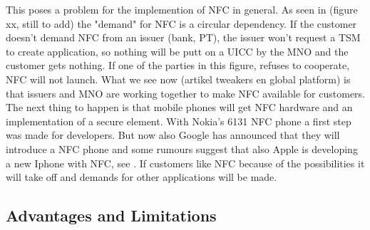 This poses a problem for the implemention of NFC in general. As seen in (figure xx, still to add) the "demand" for NFC is a circular dependency. If the customer doesn't demand NFC from an issuer (bank, PT), the issuer won't request a TSM to create application, so nothing will be putt on a UICC by the MNO and the customer gets nothing. If one of the parties in this figure, refuses to cooperate, NFC will not launch. What we see now (artikel tweakers en global platform) is that issuers and MNO are working together to make NFC available for customers. The next thing to happen is that mobile phones will get NFC hardware and an implementation of a secure element. With Nokia's 6131 NFC phone a first step was made for developers. But now also Google has announced that they will introduce a NFC phone and some rumours suggest that also Apple is developing a new Iphone with NFC, see \cite{nu_artikel}. If customers like NFC because of the possibilities it will take off and demands for other applications will be made. 








\subsection{Advantages and Limitations}








